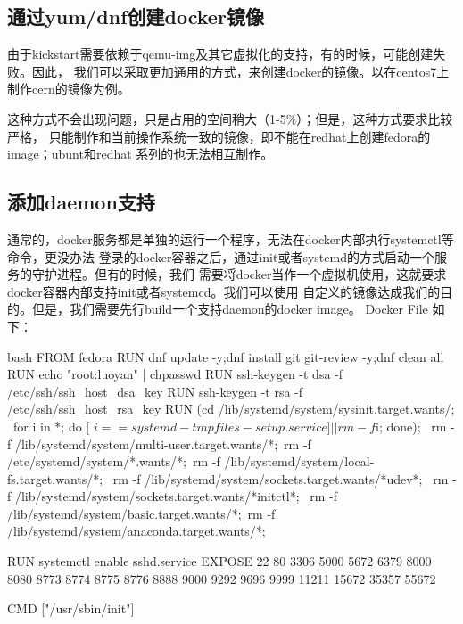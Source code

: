 \subsection{通过yum/dnf创建docker镜像}
由于kickstart需要依赖于qemu-img及其它虚拟化的支持，有的时候，可能创建失败。因此，
我们可以采取更加通用的方式，来创建docker的镜像。以在centos7上制作cern的镜像为例。

这种方式不会出现问题，只是占用的空间稍大（1-5\%）；但是，这种方式要求比较严格，
只能制作和当前操作系统一致的镜像，即不能在redhat上创建fedora的image；ubunt和redhat
系列的也无法相互制作。

\subsection{添加daemon支持}
通常的，docker服务都是单独的运行一个程序，无法在docker内部执行systemctl等命令，更没办法
登录的docker容器之后，通过init或者systemd的方式启动一个服务的守护进程。但有的时候，我们
需要将docker当作一个虚拟机使用，这就要求docker容器内部支持init或者systemcd。我们可以使用
自定义的镜像达成我们的目的。但是，我们需要先行build一个支持daemon的docker image。
Docker File 如下：
\begin{code-block}{bash}
FROM fedora
RUN dnf update -y;dnf install git git-review -y;dnf clean all
RUN echo "root:luoyan" | chpasswd
RUN ssh-keygen -t dsa -f /etc/ssh/ssh_host_dsa_key
RUN ssh-keygen -t rsa -f /etc/ssh/ssh_host_rsa_key
RUN (cd /lib/systemd/system/sysinit.target.wants/; \
for i in *; do [ $i == systemd-tmpfiles-setup.service ] || rm -f $i; done); \
rm -f /lib/systemd/system/multi-user.target.wants/*;\
rm -f /etc/systemd/system/*.wants/*;\
rm -f /lib/systemd/system/local-fs.target.wants/*; \
rm -f /lib/systemd/system/sockets.target.wants/*udev*; \
rm -f /lib/systemd/system/sockets.target.wants/*initctl*; \
rm -f /lib/systemd/system/basic.target.wants/*;\
rm -f /lib/systemd/system/anaconda.target.wants/*;

RUN systemctl enable sshd.service
EXPOSE 22 80 3306 5000 5672 6379 8000 8080 8773 8774 8775 8776 8888 9000 9292 9696 9999 11211 15672 35357 55672

CMD ["/usr/sbin/init"]
\end{code-block}

